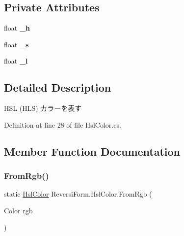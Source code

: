 \subsection*{Private Attributes}
\begin{DoxyCompactItemize}
\item 
\mbox{\label{class_reversi_form_1_1_hsl_color_a5a716a224d15c7fcf69651a92266149c}} 
float {\bfseries \+\_\+h}
\item 
\mbox{\label{class_reversi_form_1_1_hsl_color_a2bf5f2795724a5a660db280c6c8828d8}} 
float {\bfseries \+\_\+s}
\item 
\mbox{\label{class_reversi_form_1_1_hsl_color_af0394b4aa6c74f24eb86486b5c2bacc9}} 
float {\bfseries \+\_\+l}
\end{DoxyCompactItemize}


\subsection{Detailed Description}
H\+SL (H\+LS) カラーを表す 

Definition at line 28 of file Hsl\+Color.\+cs.



\subsection{Member Function Documentation}
\mbox{\label{class_reversi_form_1_1_hsl_color_a1ef52b0701860ca2021e74e8ee369789}} 
\subsubsection{\texorpdfstring{From\+Rgb()}{FromRgb()}}
{\footnotesize\ttfamily static \hyperlink{class_reversi_form_1_1_hsl_color}{Hsl\+Color} Reversi\+Form.\+Hsl\+Color.\+From\+Rgb (\begin{DoxyParamCaption}\item[{Color}]{rgb }\end{DoxyParamCaption})\hspace{0.3cm}{\ttfamily [static]}}



